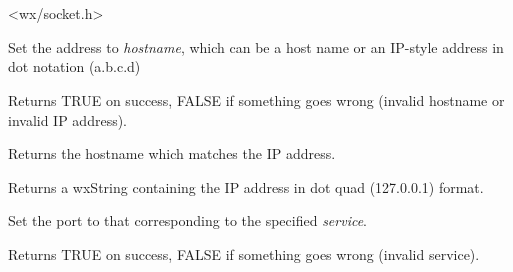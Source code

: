 \section{}\label{wxipv4address}




<wx/socket.h>


%
%



Set the address to {\it hostname}, which can be a host name
or an IP-style address in dot notation (a.b.c.d)


Returns TRUE on success, FALSE if something goes wrong
(invalid hostname or invalid IP address).

%
%



Returns the hostname which matches the IP address.

%
%



Returns a wxString containing the IP address in dot quad (127.0.0.1) format.

%
%



Set the port to that corresponding to the specified {\it service}.


Returns TRUE on success, FALSE if something goes wrong
(invalid service).

